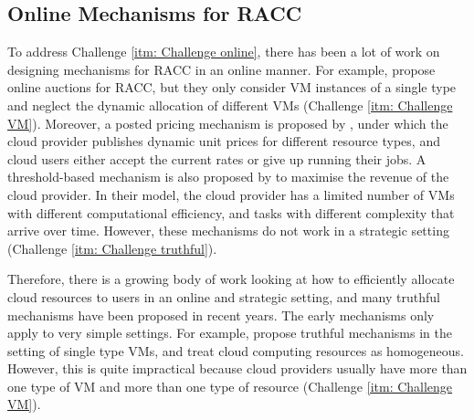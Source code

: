 \documentclass[11pt]{phdthesis}
\begin{document}
\subsection{Online Mechanisms for RACC} \label{online-mechanisms-for-RACC}
To address Challenge \ref{itm: Challenge online}, there has been a lot of work on designing mechanisms for RACC in an online manner. For example, \citet{wang2013revenue,zhang2016framework} propose online auctions for RACC, but they only consider VM instances of a single type and neglect the dynamic allocation of different VMs (Challenge \ref{itm: Challenge VM}). Moreover, a posted pricing mechanism is proposed by \citet{zhang2017optimal}, under which the cloud provider publishes dynamic unit prices for different resource types, and cloud users either accept the current rates or give up running their jobs. A threshold-based mechanism is also proposed by \citet{farooq2018adaptive} to maximise the revenue of the cloud provider. In their model, the cloud provider has a limited number of VMs with different computational efficiency, and tasks with different complexity that arrive over time. However, these mechanisms do not work in a strategic setting (Challenge \ref{itm: Challenge truthful}). 

Therefore, there is a growing body of work looking at how to efficiently allocate cloud resources to users in an online and strategic setting, and many truthful mechanisms have been proposed in recent years. The early mechanisms only apply to very simple settings. For example, \citet{wang2012pcloud,zhang2016framework} propose truthful mechanisms in the setting of single type VMs, and \citet{lin2010dynamic} treat cloud computing resources as homogeneous. However, this is quite impractical because cloud providers usually have more than one type of VM and more than one type of resource (Challenge \ref{itm: Challenge VM}).
\end{document}
